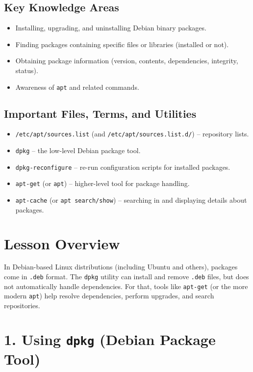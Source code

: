 \documentclass[12pt,a4paper]{report}
\begin{document}
\subsection*{Key Knowledge Areas}
\begin{itemize}
    \item Installing, upgrading, and uninstalling Debian binary packages.  
    \item Finding packages containing specific files or libraries (installed or not).  
    \item Obtaining package information (version, contents, dependencies, integrity, status).  
    \item Awareness of \texttt{apt} and related commands.
\end{itemize}

\subsection*{Important Files, Terms, and Utilities}
\begin{itemize}
    \item \texttt{/etc/apt/sources.list} (and \texttt{/etc/apt/sources.list.d/}) – repository lists.  
    \item \texttt{dpkg} – the low-level Debian package tool.  
    \item \texttt{dpkg-reconfigure} – re-run configuration scripts for installed packages.  
    \item \texttt{apt-get} (or \texttt{apt}) – higher-level tool for package handling.  
    \item \texttt{apt-cache} (or \texttt{apt search/show}) – searching in and displaying details about packages.
\end{itemize}

 

\section*{Lesson Overview}

In Debian-based Linux distributions (including Ubuntu and others), packages come in \texttt{.deb} format. The \texttt{dpkg} utility can install and remove \texttt{.deb} files, but does not automatically handle dependencies. For that, tools like \texttt{apt-get} (or the more modern \texttt{apt}) help resolve dependencies, perform upgrades, and search repositories.

 

\section*{1. Using \texttt{dpkg} (Debian Package Tool)}
\end{document}
